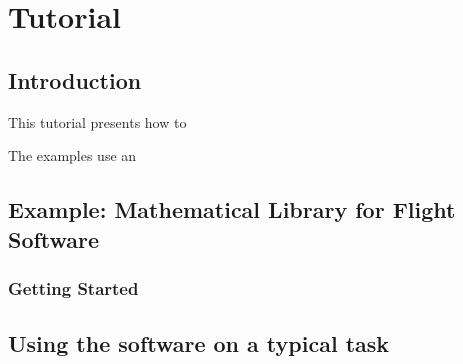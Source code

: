 
\chapter{Tutorial}

\section{Introduction}

This tutorial presents how to

The examples use an

\section{Example: Mathematical Library for Flight Software}

\subsection{Getting Started}

\section{Using the software on a typical task}

